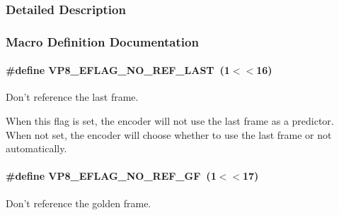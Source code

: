 \subsubsection{Detailed Description}


\subsubsection{Macro Definition Documentation}
\hypertarget{group__vp8__encoder_gafb51c67e5743275146bc1fc425727da3}{
\paragraph[{V\+P8\+\_\+\+E\+F\+L\+A\+G\+\_\+\+N\+O\+\_\+\+R\+E\+F\+\_\+\+L\+A\+S\+T}]{\setlength{\rightskip}{0pt plus 5cm}\#define V\+P8\+\_\+\+E\+F\+L\+A\+G\+\_\+\+N\+O\+\_\+\+R\+E\+F\+\_\+\+L\+A\+S\+T~(1$<$$<$16)}}\label{group__vp8__encoder_gafb51c67e5743275146bc1fc425727da3}


Don't reference the last frame. 

When this flag is set, the encoder will not use the last frame as a predictor. When not set, the encoder will choose whether to use the last frame or not automatically. \hypertarget{group__vp8__encoder_gabb5e95343a2738abef44eca13059da33}{
\paragraph[{V\+P8\+\_\+\+E\+F\+L\+A\+G\+\_\+\+N\+O\+\_\+\+R\+E\+F\+\_\+\+G\+F}]{\setlength{\rightskip}{0pt plus 5cm}\#define V\+P8\+\_\+\+E\+F\+L\+A\+G\+\_\+\+N\+O\+\_\+\+R\+E\+F\+\_\+\+G\+F~(1$<$$<$17)}}\label{group__vp8__encoder_gabb5e95343a2738abef44eca13059da33}


Don't reference the golden frame. 

